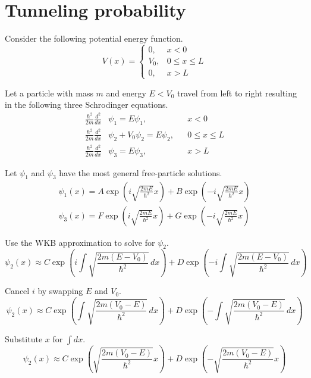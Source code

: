 

\section*{Tunneling probability}

Consider the following potential energy function.
\begin{equation*}
V(x)=\begin{cases}
0, & x<0
\\
V_0, & 0\le x\le L
\\
0, & x>L
\end{cases}
\end{equation*}

Let a particle with mass $m$ and energy $E<V_0$ travel from left to right
resulting in the following three Schrodinger equations.
\begin{align*}
\frac{\hbar^2}{2m}\frac{d^2}{dx}&\psi_1=E\psi_1, & &x<0
\\[1ex]
\frac{\hbar^2}{2m}\frac{d^2}{dx}&\psi_2+V_0\psi_2=E\psi_2, & &0\le x\le L
\\[1ex]
\frac{\hbar^2}{2m}\frac{d^2}{dx}&\psi_3=E\psi_3, & &x>L
\end{align*}

Let $\psi_1$ and $\psi_3$ have the most general
free-particle solutions.
\begin{align*}
\psi_1(x)=A\exp\left(i\sqrt{\frac{2mE}{\hbar^2}}x\right)
+B\exp\left(-i\sqrt{\frac{2mE}{\hbar^2}}x\right)
\\
\psi_3(x)=F\exp\left(i\sqrt{\frac{2mE}{\hbar^2}}x\right)
+G\exp\left(-i\sqrt{\frac{2mE}{\hbar^2}}x\right)
\end{align*}

Use the WKB approximation to solve for $\psi_2$.
\begin{equation*}
\psi_2(x)\approx
C\exp\left(i\int\sqrt{\frac{2m(E-V_0)}{\hbar^2}}\,dx\right)
+D\exp\left(-i\int\sqrt{\frac{2m(E-V_0)}{\hbar^2}}\,dx\right)
\end{equation*}

Cancel $i$ by swapping $E$ and $V_0$.
\begin{equation*}
\psi_2(x)\approx
C\exp\left(\int\sqrt{\frac{2m(V_0-E)}{\hbar^2}}\,dx\right)
+D\exp\left(-\int\sqrt{\frac{2m(V_0-E)}{\hbar^2}}\,dx\right)
\end{equation*}

Substitute $x$ for $\int dx$.
\begin{equation*}
\psi_2(x)\approx
C\exp\left(\sqrt{\frac{2m(V_0-E)}{\hbar^2}}x\right)
+D\exp\left(-\sqrt{\frac{2m(V_0-E)}{\hbar^2}}x\right)
\end{equation*}

